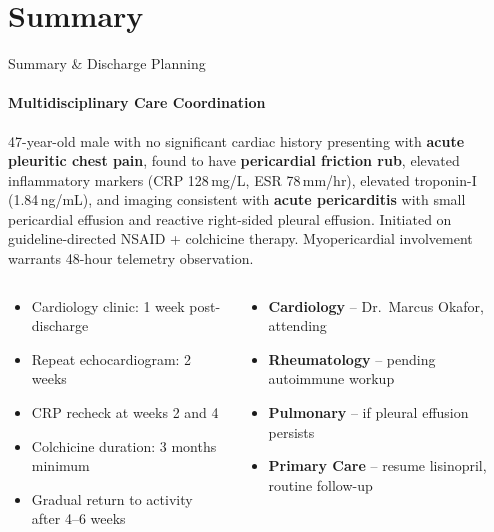 \section{Summary}
\begin{frame}{Summary \& Discharge Planning}
  \framesubtitle{Multidisciplinary Care Coordination}

  \begin{tcolorbox}[infobox,title={\faClipboard\hspace{4pt}Case Summary}]
    \small
    47-year-old male with no significant cardiac history presenting with \textbf{acute pleuritic chest pain}, found to have \textbf{pericardial friction rub}, elevated inflammatory markers (CRP 128\,mg/L, ESR 78\,mm/hr), elevated troponin-I (1.84\,ng/mL), and imaging consistent with \textbf{acute pericarditis} with small pericardial effusion and reactive right-sided pleural effusion. Initiated on guideline-directed NSAID + colchicine therapy. Myopericardial involvement warrants 48-hour telemetry observation.
  \end{tcolorbox}

  \vspace{0.3cm}

  \begin{columns}[T]
    \begin{tcolorbox}[highlightbox,title={\faCalendar\hspace{4pt}Follow-Up Plan}]
      \small
      \begin{itemize}
        \item Cardiology clinic: 1 week post-discharge
        \item Repeat echocardiogram: 2 weeks
        \item CRP recheck at weeks 2 and 4
        \item Colchicine duration: 3 months minimum
        \item Gradual return to activity after 4--6 weeks
      \end{itemize}
    \end{tcolorbox}

    \begin{tcolorbox}[infobox,title={\faUserMd\hspace{4pt}Consulting Services}]
      \small
      \begin{itemize}
        \item \textbf{Cardiology} -- Dr.\ Marcus Okafor, attending
        \item \textbf{Rheumatology} -- pending autoimmune workup
        \item \textbf{Pulmonary} -- if pleural effusion persists
        \item \textbf{Primary Care} -- resume lisinopril, routine follow-up
      \end{itemize}
    \end{tcolorbox}
  \end{columns}


\end{frame}
